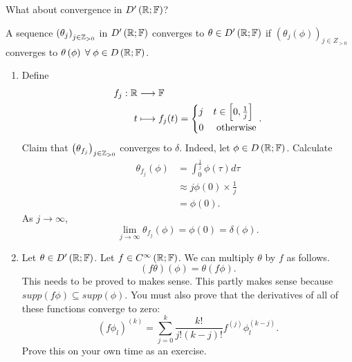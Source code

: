 What about convergence in $D'\left( \mathbb{R}; \mathbb{F} \right) $?

\begin{definition}
	A sequence $\left( \theta_{j} \right) _{j \in  \mathbb{Z}_{>0}}$ in $D'\left( \mathbb{R}; \mathbb{F} \right) $ converges to $\theta \in D'\left( \mathbb{R}; \mathbb{F} \right) $ if $\left( \theta_{j}\left(  \phi   \right)  \right)_{j \in  Z_{>0}} $ converges to $\theta \left( \phi \right) \forall \phi \in D\left( \R; \F \right) $. 
\end{definition}

\begin{eg}
	\begin{enumerate}
		\item Define \begin{align*}
			f_{j}: \mathbb{R} &\longrightarrow \mathbb{F} \\
			t &\longmapsto f_{j}(t) = \begin{cases}
				j & t \in \left[ 0, \frac{1}{j} \right] \\
				0 & \text{ otherwise}
			\end{cases}
		.\end{align*}
		Claim that $\left( \theta_{f_{j}} \right) _{j \in  \mathbb{Z}_{>0}}$ converges to $\delta$. Indeed, let $\phi \in  D\left( \mathbb{R}; \mathbb{F} \right) $. Calculate
		\begin{align*}
			\theta_{f_{j}}\left( \phi \right)  &= \int_{0}^{\frac{1}{j}} \phi\left( \tau \right) d \tau  \\
							      &\approx j \phi\left( 0 \right)  \times  \frac{1}{j} \\
							      &= \phi\left( 0 \right) 
		.\end{align*}
		As $j \to \infty$, 
		\[
			\lim_{j \to \infty} \theta_{f_{j}}\left( \phi \right)  = \phi\left( 0 \right) = \delta\left( \phi \right) 
		.\] 
	\item Let $\theta \in  D'\left( \mathbb{R}; \mathbb{F} \right) $. Let $f \in C^{\infty}\left( \mathbb{R}; \mathbb{F} \right) $. We can multiply $\theta $ by $f$ as follows.
		\[
			\left( f \theta \right)\left( \phi \right) = \theta \left( f\phi \right)  
		.\]
This needs to be proved to makes sense. This partly makes sense because $supp\left( f \phi \right) \subseteq supp\left( \phi \right) $.  You must also prove that the derivatives of all of these functions converge to zero: 
\[
	\left( f\phi _{l}\right) ^{\left( k \right) } = \sum_{j=0}^{k} \frac{k!}{j! \left( k-j \right) !} f^{\left( j \right) } \phi_{l}^{\left( k - j \right) }
.\]
Prove this on your own time as an exercise. 
	\end{enumerate}
\end{eg}

